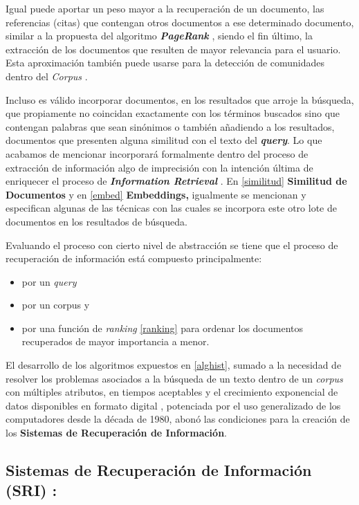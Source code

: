 \documentclass[
  10,
  openany]{book}
\begin{document}
Igual puede aportar un peso mayor a la recuperación de un documento, las referencias (citas) que contengan otros documentos a ese determinado documento, similar a la propuesta del algoritmo \textbf{\emph{PageRank}} \citep{brin1998}, siendo el fin último, la extracción de los documentos que resulten de mayor relevancia para el usuario. Esta aproximación también puede usarse para la detección de comunidades dentro del \emph{Corpus} \citep{heydari2020analysis}.

Incluso es válido incorporar documentos, en los resultados que arroje la búsqueda, que propiamente no coincidan exactamente con los términos buscados sino que contengan palabras que sean sinónimos o también añadiendo a los resultados, documentos que presenten alguna similitud con el texto del \textbf{\emph{query}}. Lo que acabamos de mencionar incorporará formalmente dentro del proceso de extracción de información algo de imprecisión con la intención última de enriquecer el proceso de \textbf{\emph{Information Retrieval}} \citep{kraft2017}. En \ref{similitud} \textbf{Similitud de Documentos} y en \ref{embed} \textbf{Embeddings,} igualmente se mencionan y especifican algunas de las técnicas con las cuales se incorpora este otro lote de documentos en los resultados de búsqueda.

Evaluando el proceso con cierto nivel de abstracción se tiene que el proceso de recuperación de información está compuesto principalmente:

\begin{itemize}
\item
  por un \emph{query}
\item
  por un corpus y
\item
  por una función de \emph{ranking} \ref{ranking} para ordenar los documentos recuperados de mayor importancia a menor.
\end{itemize}

El desarrollo de los algoritmos expuestos en \ref{alghist}, sumado a la necesidad de resolver los problemas asociados a la búsqueda de un texto dentro de un \emph{corpus} con múltiples atributos, en tiempos aceptables y el crecimiento exponencial de datos disponibles en formato digital \citep{worldde2016}, potenciada por el uso generalizado de los computadores desde la década de 1980, abonó las condiciones para la creación de los \textbf{Sistemas de Recuperación de Información}.

\hypertarget{SRI}{%
\subsection{Sistemas de Recuperación de Información (SRI) :}\label{SRI}}
\end{document}
